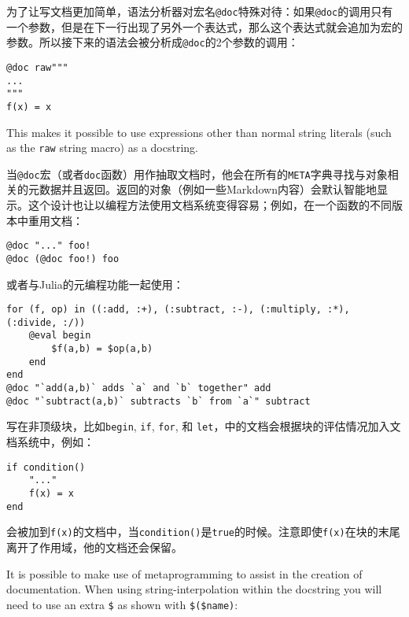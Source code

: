为了让写文档更加简单，语法分析器对宏名\texttt{@doc}特殊对待：如果\texttt{@doc}的调用只有一个参数，但是在下一行出现了另外一个表达式，那么这个表达式就会追加为宏的参数。所以接下来的语法会被分析成\texttt{@doc}的2个参数的调用：




\begin{verbatim}
@doc raw"""
...
"""
f(x) = x
\end{verbatim}



This makes it possible to use expressions other than normal string literals (such as the \texttt{raw{\textquotedbl}{\textquotedbl}} string macro) as a docstring.



当\texttt{@doc}宏（或者\texttt{doc}函数）用作抽取文档时，他会在所有的\texttt{META}字典寻找与对象相关的元数据并且返回。返回的对象（例如一些Markdown内容）会默认智能地显示。这个设计也让以编程方法使用文档系统变得容易；例如，在一个函数的不同版本中重用文档：




\begin{verbatim}
@doc "..." foo!
@doc (@doc foo!) foo
\end{verbatim}



或者与Julia的元编程功能一起使用：




\begin{verbatim}
for (f, op) in ((:add, :+), (:subtract, :-), (:multiply, :*), (:divide, :/))
    @eval begin
        $f(a,b) = $op(a,b)
    end
end
@doc "`add(a,b)` adds `a` and `b` together" add
@doc "`subtract(a,b)` subtracts `b` from `a`" subtract
\end{verbatim}



写在非顶级块，比如\texttt{begin}, \texttt{if}, \texttt{for}, 和 \texttt{let}，中的文档会根据块的评估情况加入文档系统中，例如：




\begin{verbatim}
if condition()
    "..."
    f(x) = x
end
\end{verbatim}



会被加到\texttt{f(x)}的文档中，当\texttt{condition()}是\texttt{true}的时候。注意即使\texttt{f(x)}在块的末尾离开了作用域，他的文档还会保留。



It is possible to make use of metaprogramming to assist in the creation of documentation. When using string-interpolation within the docstring you will need to use an extra \texttt{\$} as shown with \texttt{\$(\$name)}:




